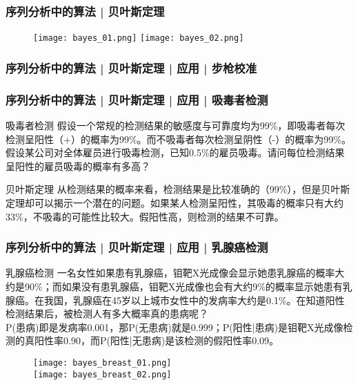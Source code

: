 \begin{frame}
  \frametitle{序列分析中的算法 | 贝叶斯定理}
  \begin{figure}
    \centering
    \texttt{[image: bayes\_01.png]}
    \texttt{[image: bayes\_02.png]}
  \end{figure}
\end{frame}

\begin{frame}
  \frametitle{序列分析中的算法 | 贝叶斯定理 | 应用 | 步枪校准}
  \begin{figure}
    \centering
  \end{figure}
\end{frame}

\begin{frame}
  \frametitle{序列分析中的算法 | 贝叶斯定理 | 应用 | 吸毒者检测}
  \begin{block}{吸毒者检测}
    假设一个常规的检测结果的敏感度与可靠度均为99\%，即吸毒者每次检测呈阳性（+）的概率为99\%。而不吸毒者每次检测呈阴性（-）的概率为99\%。假设某公司对全体雇员进行吸毒检测，已知0.5\%的雇员吸毒。请问每位检测结果呈阳性的雇员吸毒的概率有多高？
  \end{block}
  \pause
  \begin{block}{贝叶斯定理}
从检测结果的概率来看，检测结果是比较准确的（99\%），但是贝叶斯定理却可以揭示一个潜在的问题。如果某人检测呈阳性，其吸毒的概率只有大约33\%，不吸毒的可能性比较大。假阳性高，则检测的结果不可靠。
  \end{block}
  \begin{figure}
    \centering
  \end{figure}
\end{frame}

\begin{frame}
  \frametitle{序列分析中的算法 | 贝叶斯定理 | 应用 | 乳腺癌检测}
  \begin{block}{乳腺癌检测}
一名女性如果患有乳腺癌，钼靶X光成像会显示她患乳腺癌的概率大约是90\%；而如果没有患乳腺癌，钼靶X光成像也会有大约9\%的概率显示她患有乳腺癌。在我国，乳腺癌在45岁以上城市女性中的发病率大约是0.1\%。在知道阳性检测结果后，被检测人有多大概率真的患病呢？\\
\vspace{0.8em}
P(患病)即是发病率0.001，那P(无患病)就是0.999；P(阳性|患病)是钼靶X光成像检测的真阳性率0.90，而P(阳性|无患病)是该检测的假阳性率0.09。
  \end{block}
  \begin{figure}
    \centering
    \texttt{[image: bayes\_breast\_01.png]}\\
    \vspace{1em}
    \texttt{[image: bayes\_breast\_02.png]}
  \end{figure}
\end{frame}

